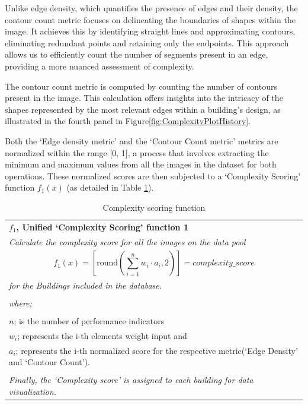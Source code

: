 Unlike edge density, which quantifies the presence of edges and their density, the contour count metric focuses on delineating the boundaries of shapes within the image.
It achieves this by identifying straight lines and approximating contours, eliminating redundant points and retaining only the endpoints\cite{ContourOpenCV2023}.
This approach allows us to efficiently count the number of segments present in an edge, providing a more nuanced assessment of complexity.

The contour count metric is computed by counting the number of contours present in the image.
This calculation offers insights into the intricacy of the shapes represented by the most relevant edges within a building's design, as illustrated in the fourth panel in Figure\ref{fig:ComplexityPlotHistory}.

Both the `Edge density metric' and the `Contour Count metric' metrics are normalized within the range [0, 1], a process that involves extracting the minimum and maximum values from all the images in the dataset for both operations.
These normalized scores are then subjected to a `Complexity Scoring' function \(f_1(x)\) (as detailed in Table \ref{tab:ComplexityScoreFunction_table}).

    \begin{table}[htb]
        \caption{Complexity scoring function }
        \label{tab:ComplexityScoreFunction_table}
        \centering
        \small
        \begin{tabular}{|p{8cm}|}
        \hline
            \textbf{\(f_1\), Unified `Complexity Scoring' function 1}\\
            \textit{Calculate the complexity score for all the images on the data pool}
            \\
            \begin{equation}
                f_1(x) = \left[ \mathrm{round}\left(\sum_{i=1}^{n} w_i \cdot a_i, 2\right) \right] = complexity\_score
            \label{eq:F1_ComplexityScoreFunction}
            \end{equation}

            \\
            \textit{ for the Buildings included in the database.}\\
            \\
            \textit{where;} \\
            \\
            \(n \); is the number of performance indicators \\
            \(w_i \); represents the i-th elements weight input and \\
            \(a_i \); represents the i-th normalized score for the respective metric(`Edge Density' and `Contour Count').\\
            \\

            \textit{Finally, the `Complexity score' is assigned to each building for data visualization.}\\
        \hline
        \end{tabular}
    \end{table}

